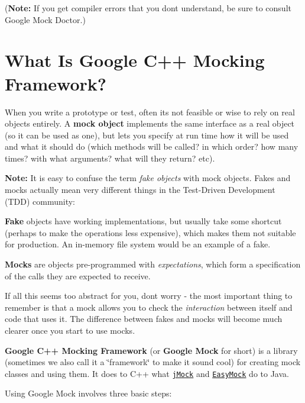 ({\bfseries Note\+:} If you get compiler errors that you don\textquotesingle{}t understand, be sure to consult Google Mock Doctor.)

\section*{What Is Google C++ Mocking Framework?}

When you write a prototype or test, often it\textquotesingle{}s not feasible or wise to rely on real objects entirely. A {\bfseries mock object} implements the same interface as a real object (so it can be used as one), but lets you specify at run time how it will be used and what it should do (which methods will be called? in which order? how many times? with what arguments? what will they return? etc).

{\bfseries Note\+:} It is easy to confuse the term {\itshape fake objects} with mock objects. Fakes and mocks actually mean very different things in the Test-\/\+Driven Development (T\+DD) community\+:


\begin{DoxyItemize}
\item {\bfseries Fake} objects have working implementations, but usually take some shortcut (perhaps to make the operations less expensive), which makes them not suitable for production. An in-\/memory file system would be an example of a fake.
\item {\bfseries Mocks} are objects pre-\/programmed with {\itshape expectations}, which form a specification of the calls they are expected to receive.
\end{DoxyItemize}

If all this seems too abstract for you, don\textquotesingle{}t worry -\/ the most important thing to remember is that a mock allows you to check the {\itshape interaction} between itself and code that uses it. The difference between fakes and mocks will become much clearer once you start to use mocks.

{\bfseries Google C++ Mocking Framework} (or {\bfseries Google Mock} for short) is a library (sometimes we also call it a \char`\"{}framework\char`\"{} to make it sound cool) for creating mock classes and using them. It does to C++ what \href{http://www.jmock.org/}{\tt j\+Mock} and \href{http://www.easymock.org/}{\tt Easy\+Mock} do to Java.

Using Google Mock involves three basic steps\+:


